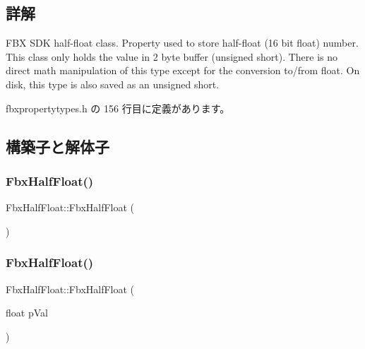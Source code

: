 \subsection{詳解}
F\+BX S\+DK half-\/float class. Property used to store half-\/float (16 bit float) number. This class only holds the value in 2 byte buffer (unsigned short). There is no direct math manipulation of this type except for the conversion to/from float. On disk, this type is also saved as an unsigned short. 

 fbxpropertytypes.\+h の 156 行目に定義があります。



\subsection{構築子と解体子}
\mbox{\label{class_fbx_half_float_adcba4ec850646381daa19115b9e40879}} 
\subsubsection{\texorpdfstring{Fbx\+Half\+Float()}{FbxHalfFloat()}\hspace{0.1cm}{\footnotesize\ttfamily [1/3]}}
{\footnotesize\ttfamily Fbx\+Half\+Float\+::\+Fbx\+Half\+Float (\begin{DoxyParamCaption}{ }\end{DoxyParamCaption})}

\mbox{\label{class_fbx_half_float_acd47a47c67b0d9c57bfbb7055615c303}} 
\subsubsection{\texorpdfstring{Fbx\+Half\+Float()}{FbxHalfFloat()}\hspace{0.1cm}{\footnotesize\ttfamily [2/3]}}
{\footnotesize\ttfamily Fbx\+Half\+Float\+::\+Fbx\+Half\+Float (\begin{DoxyParamCaption}\item[{float}]{p\+Val }\end{DoxyParamCaption})}

